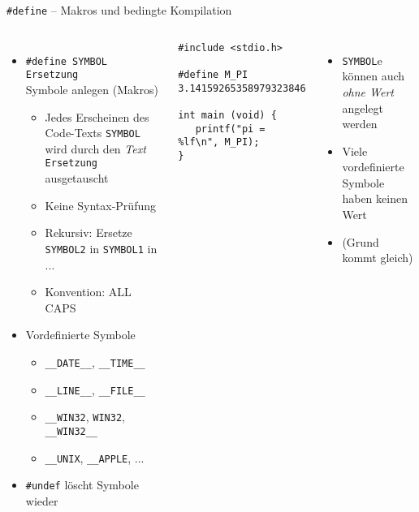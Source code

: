 
\begin{frame}[fragile]{\texttt{\#define} -- Makros und bedingte Kompilation}
%
\begin{columns}[T]
\vspace{-5pt}
\begin{itemize}
\item \texttt{#define SYMBOL Ersetzung}\\ Symbole anlegen (Makros)
	\begin{itemize}
	\item Jedes Erscheinen des Code-Texts \texttt{SYMBOL} wird durch den \emph{Text} \texttt{Ersetzung} ausgetauscht
	\item Keine Syntax-Prüfung
	\item Rekursiv: Ersetze \texttt{SYMBOL2} in \texttt{SYMBOL1} in ...
	\item Konvention: ALL CAPS
	\end{itemize}
\item Vordefinierte Symbole
	\begin{itemize}
	\item \texttt{\_\_DATE\_\_}, \texttt{\_\_TIME\_\_}
	\item \texttt{\_\_LINE\_\_}, \texttt{\_\_FILE\_\_}
	\item \texttt{\_\_WIN32}, \texttt{WIN32}, \texttt{\_\_WIN32\_\_}
	\item \texttt{\_\_UNIX}, \texttt{\_\_APPLE}, ...
	\end{itemize}
\item \texttt{#undef} löscht Symbole wieder
\end{itemize}
%
\vspace{-10pt}
\begin{codebox}
\begin{verbatim}
#include <stdio.h>

#define M_PI 3.14159265358979323846

int main (void) {
   printf("pi = %lf\n", M_PI);
}
\end{verbatim}
\end{codebox}

\begin{itemize}
\item \texttt{SYMBOL}e können auch \emph{ohne Wert} angelegt werden
\item Viele vordefinierte Symbole haben keinen Wert
\item (Grund kommt gleich)
\end{itemize}
\end{columns}
%
\end{frame}

